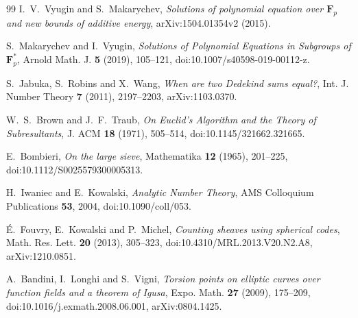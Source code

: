 \documentclass[11pt]{article}
\begin{document}
\begin{thebibliography}{99}
I.~V.~Vyugin and S.~Makarychev,
\emph{Solutions of polynomial equation over $\mathbf F_p$ and new bounds of additive energy},
arXiv:1504.01354v2 (2015).

S.~Makarychev and I.~Vyugin,
\emph{Solutions of Polynomial Equations in Subgroups of $\mathbf F_p^*$},
Arnold Math. J. \textbf{5} (2019), 105--121,
doi:10.1007/s40598-019-00112-z.

S.~Jabuka, S.~Robins and X.~Wang,
\emph{When are two Dedekind sums equal?},
Int. J. Number Theory \textbf{7} (2011), 2197--2203,
arXiv:1103.0370.

W.~S.~Brown and J.~F.~Traub,
\emph{On Euclid's Algorithm and the Theory of Subresultants},
J. ACM \textbf{18} (1971), 505--514,
doi:10.1145/321662.321665.

E.~Bombieri,
\emph{On the large sieve},
Mathematika \textbf{12} (1965), 201--225,
doi:10.1112/S0025579300005313.

H.~Iwaniec and E.~Kowalski,
\emph{Analytic Number Theory},
AMS Colloquium Publications \textbf{53}, 2004,
doi:10.1090/coll/053.

\'E.~Fouvry, E.~Kowalski and P.~Michel,
\emph{Counting sheaves using spherical codes},
Math. Res. Lett. \textbf{20} (2013), 305--323,
doi:10.4310/MRL.2013.V20.N2.A8,
arXiv:1210.0851.

A.~Bandini, I.~Longhi and S.~Vigni,
\emph{Torsion points on elliptic curves over function fields and a theorem of Igusa},
Expo. Math. \textbf{27} (2009), 175--209,
doi:10.1016/j.exmath.2008.06.001,
arXiv:0804.1425.

\end{thebibliography}
\end{document}
